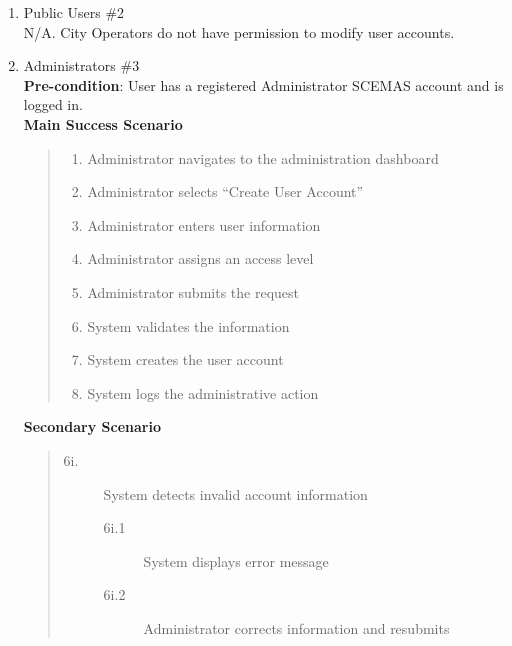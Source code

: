 \documentclass[]{article}
\begin{document}
\begin{enumerate}[{\bf BE9.}]
\begin{enumerate}[{\bf VP1.}]
            \item Public Users \#2\\
                N/A. City Operators do not have permission to modify user accounts.

			\item Administrators \#3\\
                \textbf{Pre-condition}: User has a registered Administrator SCEMAS account and is logged in. \\
                \textbf{Main Success Scenario}
                \begin{quote}
                    \begin{enumerate}[1.]
                        \item Administrator navigates to the administration dashboard
                        \item Administrator selects ``Create User Account''
                        \item Administrator enters user information
                        \item Administrator assigns an access level
                        \item Administrator submits the request
                        \item System validates the information
                        \item System creates the user account
                        \item System logs the administrative action
                    \end{enumerate}
                \end{quote}
                \textbf{Secondary Scenario}
                \begin{quote}
                    \begin{description}
                        \item[\textmd{6i.}] System detects invalid account information
                        \begin{description}
                            \item[\textmd{6i.1}] System displays error message
                            \item[\textmd{6i.2}] Administrator corrects information and resubmits
                        \end{description}
                    \end{description}
                \end{quote}


\end{enumerate}
\end{enumerate}
\end{document}
